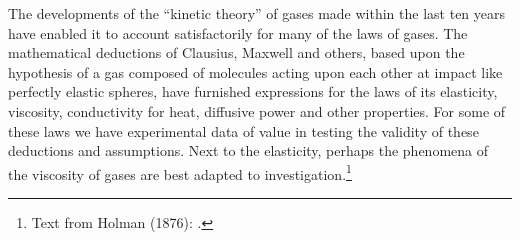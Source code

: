 %
%

The developments of the ``kinetic theory'' of gases made within the last ten years have enabled it to account satisfactorily for many of the laws of gases. The mathematical deductions of Clausius, Maxwell and others, based upon the hypothesis of a gas composed of molecules acting upon each other at impact like perfectly elastic spheres, have furnished expressions for the laws of its elasticity, viscosity, conductivity for heat, diffusive power and other properties. For some of these laws we have experimental data of value in testing the validity of these deductions and assumptions. Next to the elasticity, perhaps the phenomena of the viscosity of gases are best adapted to investigation.\footnote{Text from Holman (1876): .}  
